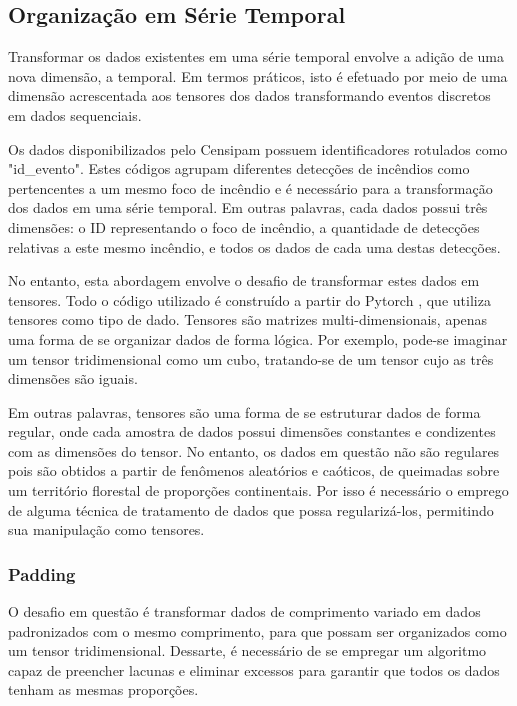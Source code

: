 \subsection{Organização em Série Temporal}

Transformar os dados existentes em uma série temporal envolve a adição de uma nova dimensão, a temporal. Em termos práticos, isto é efetuado por meio de uma dimensão acrescentada aos tensores dos dados transformando eventos discretos em dados sequenciais. 

Os dados disponibilizados pelo Censipam possuem identificadores rotulados como "id\_evento". Estes códigos agrupam diferentes detecções de incêndios como pertencentes a um mesmo foco de incêndio e é necessário para a transformação dos dados em uma série temporal. Em outras palavras, cada dados possui três dimensões: o ID representando o foco de incêndio, a quantidade de detecções relativas a este mesmo incêndio, e todos os dados de cada uma destas detecções.

No entanto, esta abordagem envolve o desafio de transformar estes dados em tensores. Todo o código utilizado é construído a partir do Pytorch \cite{NEURIPS2019_9015}, que utiliza tensores como tipo de dado. Tensores são matrizes multi-dimensionais, apenas uma forma de se organizar dados de forma lógica. Por exemplo, pode-se imaginar um tensor tridimensional como um cubo, tratando-se de um tensor cujo as três dimensões são iguais.

Em outras palavras, tensores são uma forma de se estruturar dados de forma regular, onde cada amostra de dados possui dimensões constantes e condizentes com as dimensões do tensor. No entanto, os dados em questão não são regulares pois são obtidos a partir de fenômenos aleatórios e caóticos, de queimadas sobre um território florestal de proporções continentais. Por isso é necessário o emprego de alguma técnica de tratamento de dados que possa regularizá-los, permitindo sua manipulação como tensores.

\subsubsection{Padding}

O desafio em questão é transformar dados de comprimento variado em dados padronizados com o mesmo comprimento, para que possam ser organizados como um tensor tridimensional. Dessarte, é necessário de se empregar um algoritmo capaz de preencher lacunas e eliminar excessos para garantir que todos os dados tenham as mesmas proporções.

